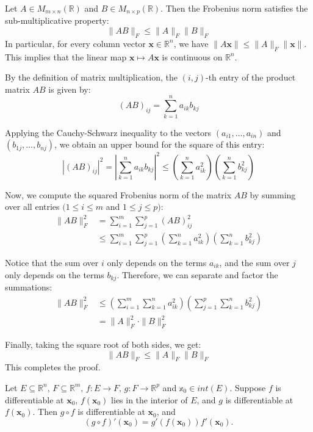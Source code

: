 \documentclass[12pt]{article}
\begin{document}
\begin{theorem}
Let $A \in M_{m \times n}(\mathbb{R})$ and $B \in M_{n \times p}(\mathbb{R})$. Then the Frobenius norm satisfies the sub-multiplicative property:
$$ \|AB\|_F \le \|A\|_F \|B\|_F $$
In particular, for every column vector $\mathbf{x} \in \mathbb{R}^n$, we have $\|A\mathbf{x}\| \le \|A\|_F \|\mathbf{x}\|$. This implies that the linear map $\mathbf{x} \mapsto A\mathbf{x}$ is continuous on $\mathbb{R}^n$.
\end{theorem}

\begin{dbox}
\begin{pf}
By the definition of matrix multiplication, the $(i, j)$-th entry of the product matrix $AB$ is given by:
$$(AB)_{ij} = \sum_{k=1}^n a_{ik} b_{kj}$$

Applying the Cauchy-Schwarz inequality to the vectors $(a_{i1}, \dots, a_{in})$ and $(b_{1j}, \dots, b_{nj})$, we obtain an upper bound for the square of this entry:
$$|(AB)_{ij}|^2 = \left| \sum_{k=1}^n a_{ik} b_{kj} \right|^2 \le \left( \sum_{k=1}^n a_{ik}^2 \right) \left( \sum_{k=1}^n b_{kj}^2 \right)$$

Now, we compute the squared Frobenius norm of the matrix $AB$ by summing over all entries $(1 \le i \le m$ and $1 \le j \le p)$:
\begin{align*}
\|AB\|_F^2 &= \sum_{i=1}^m \sum_{j=1}^p (AB)_{ij}^2 \\
&\le \sum_{i=1}^m \sum_{j=1}^p \left( \sum_{k=1}^n a_{ik}^2 \right) \left( \sum_{k=1}^n b_{kj}^2 \right)
\end{align*}

Notice that the sum over $i$ only depends on the terms $a_{ik}$, and the sum over $j$ only depends on the terms $b_{kj}$. Therefore, we can separate and factor the summations:
\begin{align*}
\|AB\|_F^2 &\le \left( \sum_{i=1}^m \sum_{k=1}^n a_{ik}^2 \right) \left( \sum_{j=1}^p \sum_{k=1}^n b_{kj}^2 \right) \\
&= \|A\|_F^2 \cdot \|B\|_F^2
\end{align*}

Finally, taking the square root of both sides, we get:
$$ \|AB\|_F \le \|A\|_F \|B\|_F $$
This completes the proof.
\end{pf}
\end{dbox}

\clearpage

\begin{theorem}
Let $E \subseteq \mathbb{R}^n,\, F\subseteq\mathbb{R}^m,\, f: E \to F,\, g: F\to\mathbb{R}^p$ and $\mathbb{x}_0\in int(E).$ 
Suppose $f$ is differentiable at $\mathbf{x}_0$, $f(\mathbf{x}_0)$ lies in the interior of $E$, and $g$ is differentiable at $f(\mathbf{x}_0)$.
Then $g \circ f$ is differentiable at $\mathbf{x}_0$, and
$$(g \circ f)'(\mathbf{x}_0) = g'(f(\mathbf{x}_0)) f'(\mathbf{x}_0).$$
\end{theorem}
\end{document}
